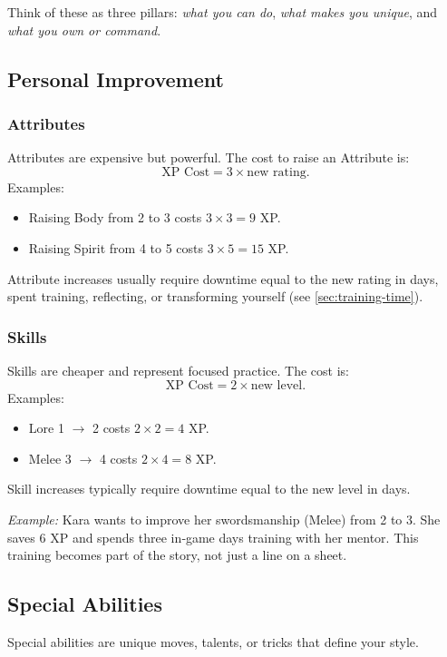 Think of these as three pillars: \textit{what you can do}, \textit{what makes you unique},
and \textit{what you own or command}.

\subsection{Personal Improvement}

\subsubsection*{Attributes}
Attributes are expensive but powerful. The cost to raise an Attribute is:
\[
\text{XP Cost} = 3 \times \text{new rating}.
\]
Examples:
\begin{itemize}
  \item Raising Body from 2 to 3 costs $3 \times 3 = 9$ XP.
  \item Raising Spirit from 4 to 5 costs $3 \times 5 = 15$ XP.
\end{itemize}
Attribute increases usually require downtime equal to the new rating in days,
spent training, reflecting, or transforming yourself (see \ref{sec:training-time}).

\subsubsection*{Skills}
Skills are cheaper and represent focused practice. The cost is:
\[
\text{XP Cost} = 2 \times \text{new level}.
\]
Examples:
\begin{itemize}
  \item Lore 1 $\rightarrow$ 2 costs $2 \times 2 = 4$ XP.
  \item Melee 3 $\rightarrow$ 4 costs $2 \times 4 = 8$ XP.
\end{itemize}
Skill increases typically require downtime equal to the new level in days.

\medskip
\noindent\textit{Example:} Kara wants to improve her swordsmanship (Melee) from 2 to 3.  
She saves 6 XP and spends three in‑game days training with her mentor. This
training becomes part of the story, not just a line on a sheet.

\subsection{Special Abilities}
Special abilities are unique moves, talents, or tricks that define your style.

